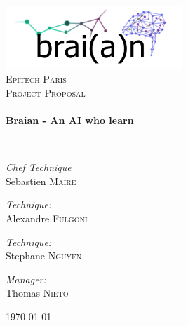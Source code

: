 \begin{titlepage}
  \begin{center}

    \includegraphics[width=0.5\textwidth]{braian}~\\[1cm]

    \textsc{\LARGE Epitech Paris}\\[1.5cm]

    \textsc{\Large Project Proposal}\\[0.5cm]

    \HRule \\[0.4cm]
    { \huge \bfseries Braian - An AI who learn \\[0.4cm] }

    \HRule \\[1.5cm]

    \noindent

    \begin{flushleft} \large
      \emph{Chef Technique}\\
      Sebastien \textsc{Maire}
    \end{flushleft}

    \begin{flushright} \large
      \emph{Technique:} \\
      Alexandre \textsc{Fulgoni}
    \end{flushright}

    \begin{flushleft} \large
      \emph{Technique:} \\
      Stephane \textsc{Nguyen}
    \end{flushleft}

    \begin{flushright} \large
      \emph{Manager:} \\
      Thomas \textsc{Nieto}
    \end{flushright}

    \vfill

    {\large \today}

  \end{center}

\end{titlepage}

